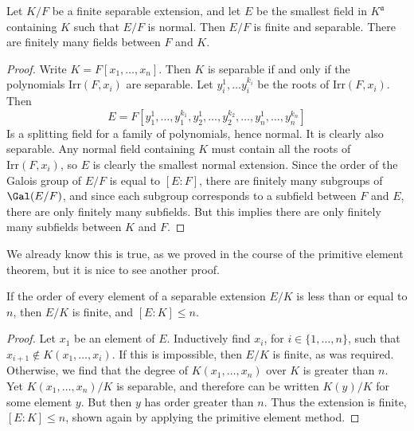 \begin{prop}
    Let $K/F$ be a finite separable extension, and let $E$ be the smallest field in $K^\mathfrak{a}$ containing $K$ such that $E/F$ is normal. Then $E/F$ is finite and separable. There are finitely many fields between $F$ and $K$.
\end{prop}
\begin{proof}
    Write $K = F[x_1, \dots, x_n]$. Then $K$ is separable if and only if the polynomials $\text{Irr}(F,x_i)$ are separable. Let $y_i^1, \dots y_i^{k_i}$ be the roots of $\text{Irr}(F,x_i)$. Then
    \[ E = F[y_1^1, \dots, y_1^{k_1}, y_2^1, \dots, y_2^{k_2}, \dots, y_n^1, \dots, y_n^{k_n}] \]
    Is a splitting field for a family of polynomials, hence normal. It is clearly also separable. Any normal field containing $K$ must contain all the roots of $\text{Irr}(F,x_i)$, so $E$ is clearly the smallest normal extension. Since the order of the Galois group of $E/F$ is equal to $[E:F]$, there are finitely many subgroups of $\Gal(E/F)$, and since each subgroup corresponds to a subfield between $F$ and $E$, there are only finitely many subfields. But this implies there are only finitely many subfields between $K$ and $F$.
\end{proof}

We already know this is true, as we proved in the course of the primitive element theorem, but it is nice to see another proof.

\begin{prop}
    If the order of every element of a separable extension $E/K$ is less than or equal to $n$, then $E/K$ is finite, and $[E:K] \leq n$.
\end{prop}
\begin{proof}
    Let $x_1$ be an element of $E$. Inductively find $x_i$, for $i \in \{ 1, \dots, n \}$, such that $x_{i+1} \not \in K(x_1, \dots, x_i)$. If this is impossible, then $E/K$ is finite, as was required. Otherwise, we find that the degree of $K(x_1, \dots, x_n)$ over $K$ is greater than $n$. Yet $K(x_1, \dots, x_n)/K$ is separable, and therefore can be written $K(y)/K$ for some element $y$. But then $y$ has order greater than $n$. Thus the extension is finite, $[E:K] \leq n$, shown again by applying the primitive element method.
\end{proof}


